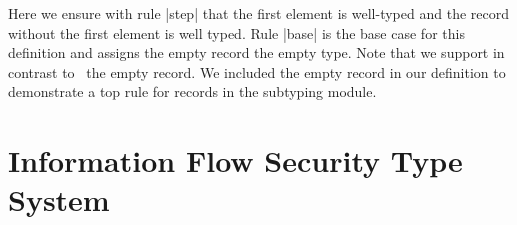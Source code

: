 Here we ensure with rule \code|step| that the first element is
well-typed and the record without the first element is well
typed. Rule \code|base| is the base case for this definition and
assigns the empty record the empty type. Note that we support in
contrast to~\cite{Pierce:2002:TPL:509043} the empty record. We
included the empty record in our definition to demonstrate a top rule
for records in the subtyping module.
\section{Information Flow Security Type System}
\label{sec:inform-flow-secur-1}

